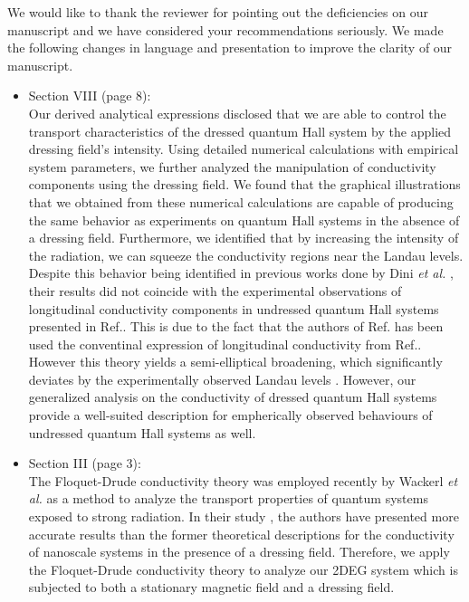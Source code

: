 \documentclass{article}
\begin{document}
We would like to thank the reviewer for pointing out the deficiencies on our manuscript and we have considered your recommendations seriously. We made the following changes in language and presentation to improve the clarity of our manuscript.

\begin{itemize}
  \item Section VIII (page 8):\\
  {\color{Maroon}
  Our derived analytical expressions disclosed that we are able to control the transport characteristics of the dressed quantum Hall system by the applied dressing field’s intensity. Using detailed numerical calculations with empirical system parameters, we further analyzed the manipulation of conductivity components using the dressing field.
  We found that the graphical illustrations that we obtained from these numerical calculations are capable of producing the same behavior as experiments on quantum Hall systems in the absence of a dressing field.
  Furthermore, we identified that by increasing the intensity of the radiation, we can squeeze the conductivity regions near the Landau levels. Despite this behavior being identified in previous works done by Dini \textit{et al.}  \cite{dini16}, their results did not coincide with the experimental observations of longitudinal conductivity components in undressed quantum Hall systems presented in Ref.\cite{endo09}. This is due to the fact that the authors of Ref.\cite{dini16} has been used the conventinal expression of longitudinal conductivity from Ref.\cite{ando74_1,ando82}. However this theory yields a semi-elliptical broadening, which significantly deviates by the experimentally observed Landau levels \cite{endo09}.
  However, our generalized analysis on the conductivity of dressed quantum Hall systems provide a well-suited description for empherically observed behaviours of undressed quantum Hall systems as well.
  }
  \item Section III (page 3):\\
  {\color{Maroon}
  The Floquet-Drude conductivity theory was employed recently by Wackerl \textit{et al.} \cite{wackerl20} as a method to analyze the transport properties of quantum systems exposed to strong radiation.
  In their study \cite{wackerl20}, the authors have presented more accurate results than the former theoretical descriptions \cite{morina15,pervishko15} for the conductivity of nanoscale systems in the  presence of a dressing field. Therefore, we apply the Floquet-Drude conductivity theory to analyze our 2DEG system which is subjected to both a stationary magnetic field and a dressing field.
  }
\end{itemize}
\end{document}

